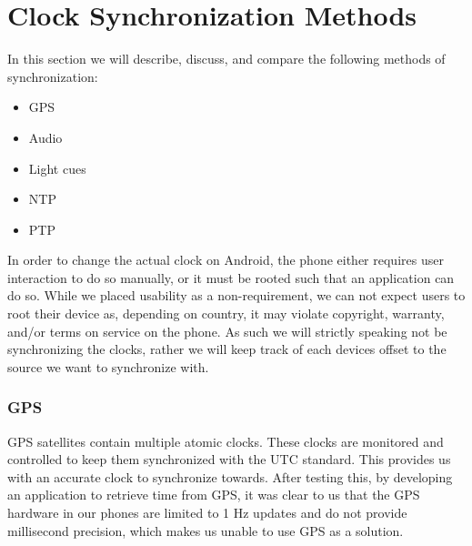 \section{Clock Synchronization Methods}
In this section we will describe, discuss, and compare the following methods of synchronization:
\begin{multicols}{2}
    \begin{itemize}
        \item GPS
        \item Audio
        \item Light cues
        \item \ac{NTP}
        \item \ac{PTP}
    \end{itemize}
\end{multicols}
In order to change the actual clock on Android, the phone either requires user interaction to do so manually, or it must be rooted such that an application can do so.
While we placed usability as a non-requirement, we can not expect users to root their device as, depending on country, it may violate copyright, warranty, and/or terms on service on the phone.
As such we will strictly speaking not be synchronizing the clocks, rather we will keep track of each devices offset to the source we want to synchronize with.

\subsubsection{GPS}
GPS satellites contain multiple atomic clocks.
These clocks are monitored and controlled to keep them synchronized with the UTC standard.
This provides us with an accurate clock to synchronize towards.\cite{gpsclock}
After testing this, by developing an application to retrieve time from GPS, it was clear to us that the GPS hardware in our phones are limited to 1 Hz updates and do not provide millisecond precision, which makes us unable to use GPS as a solution.

